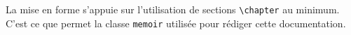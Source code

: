 La mise en forme s'appuie sur l'utilisation de sections \verb+\chapter+ au minimum. C'est ce que permet la classe \verb+memoir+ utilisée pour rédiger cette documentation.